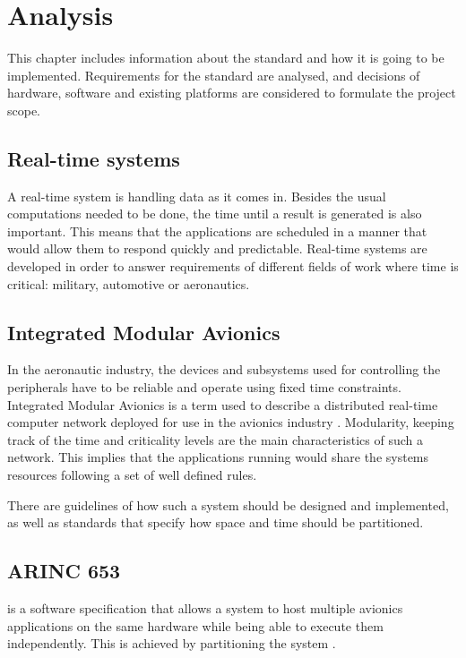 
\chapter{Analysis}\label{chap:analysis}
This chapter includes information about 
the standard and how it is going to be implemented.
Requirements for the standard are analysed, 
and decisions of hardware, software and 
existing platforms are considered
to formulate the project scope.

\section{Real-time systems}
A real-time system is handling data as it comes in.
Besides the usual computations needed to be done,
the time until a result is generated is also important.
This means that the applications are scheduled in a manner 
that would allow them to respond quickly and predictable.
Real-time systems are developed in order to answer 
requirements of different fields of work
where time is critical: military, automotive or aeronautics.

\section{Integrated Modular Avionics}
In the aeronautic industry, the devices and subsystems used for
controlling the peripherals have to be reliable and operate using
fixed time constraints. Integrated Modular Avionics is a term used
to describe a distributed real-time computer network deployed for
use in the avionics industry \cite{ima_description}.
Modularity, keeping track of the time and criticality levels are
the main characteristics of such a network.
This implies that the applications running would share the 
system\textquotesingle s resources following a set of well defined rules.

There are guidelines of how such a system should be designed and
implemented, as well as standards that specify how space and time 
should be partitioned.

\section{ARINC 653}
\arinc{} is a software specification that allows a system to host 
multiple avionics applications on the same hardware while being able
to execute them independently. This is achieved by partitioning the
system \cite{arinc_2}.

